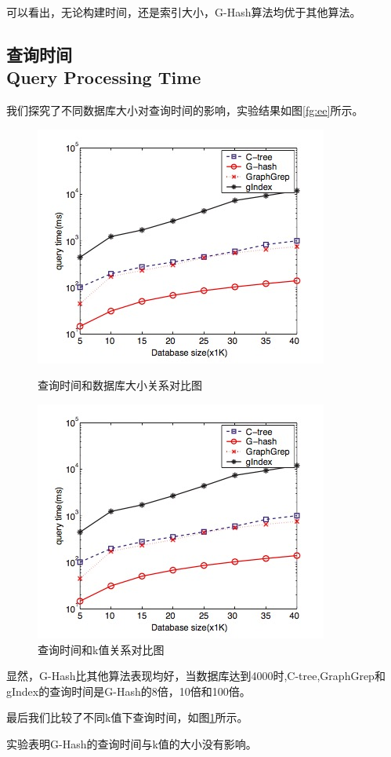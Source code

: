 \documentclass{article}
\begin{document}
可以看出，无论构建时间，还是索引大小，G-Hash算法均优于其他算法。
\subsection{查询时间 \\ Query Processing Time}
我们探究了不同数据库大小对查询时间的影响，实验结果如图\ref{fg:ee}所示。
\begin{figure}[!ht]
    \centering
    \begin{minipage}[t]{0.5\textwidth}
        \centering
        \includegraphics[width=\textwidth]{qt}
        \caption{查询时间和数据库大小关系对比图}
        \label{fg:ee}
    \end{minipage}%
    \begin{minipage}[t]{0.5\textwidth}
        \centering
         \includegraphics[width=\textwidth]{qt}
        \caption{查询时间和k值关系对比图}
        \label{fg:ek}
    \end{minipage}

\end{figure}

显然，G-Hash比其他算法表现均好，当数据库达到4000时,C-tree,GraphGrep和gIndex的查询时间是G-Hash的8倍，10倍和100倍。

最后我们比较了不同k值下查询时间，如图\ref{fg:ek}所示。


实验表明G-Hash的查询时间与k值的大小没有影响。

\ifx\allfiles\undefined
%
%
\end{document}
